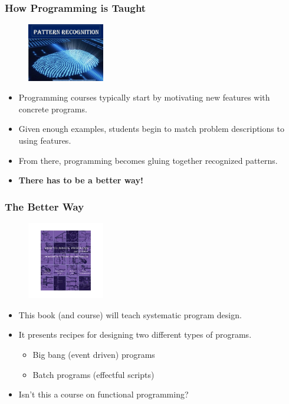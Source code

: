 \documentclass{beamer}
\begin{document}
\begin{frame}
  \frametitle{How Programming is Taught}
  \begin{figure}[t]
    \centering \includegraphics[width=0.3\textwidth]{images/pattern-recognition.jpg}
  \end{figure}
  \begin{itemize}
  \item<1-> Programming courses typically start by motivating new features with concrete programs.
  \item<2-> Given enough examples, students begin to match problem descriptions to using features.
  \item<3-> From there, programming becomes gluing together recognized patterns.
  \item<4-> \textbf{There has to be a better way!}
  \end{itemize}
\end{frame}

\begin{frame}
  \frametitle{The Better Way}
  \begin{figure}[t]
    \centering \includegraphics[width=0.3\textwidth]{images/htdp.jpeg}    
  \end{figure}
  \begin{itemize}
  \item<1-> This book (and course) will teach systematic program design.
  \item<2-> It presents recipes for designing two different types of programs.
    \begin{itemize}
    \item<3-> Big bang (event driven) programs
    \item<4-> Batch programs (effectful scripts)
    \end{itemize}
  \item<5-> Isn't this a course on functional programming?    
  \end{itemize}
\end{frame}
\end{document}
